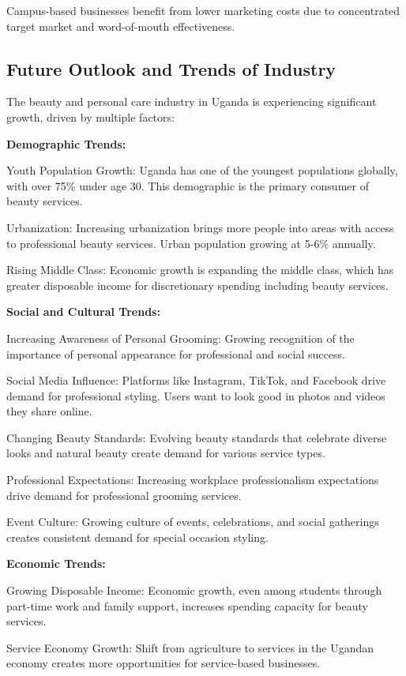 \documentclass[a4paper,12pt]{article}
\begin{document}
Campus-based businesses benefit from lower marketing costs due to concentrated target market and word-of-mouth effectiveness.

\subsection{Future Outlook and Trends of Industry}

The beauty and personal care industry in Uganda is experiencing significant growth, driven by multiple factors:

\textbf{Demographic Trends:}

Youth Population Growth: Uganda has one of the youngest populations globally, with over 75\% under age 30. This demographic is the primary consumer of beauty services.

Urbanization: Increasing urbanization brings more people into areas with access to professional beauty services. Urban population growing at 5-6\% annually.

Rising Middle Class: Economic growth is expanding the middle class, which has greater disposable income for discretionary spending including beauty services.

\textbf{Social and Cultural Trends:}

Increasing Awareness of Personal Grooming: Growing recognition of the importance of personal appearance for professional and social success.

Social Media Influence: Platforms like Instagram, TikTok, and Facebook drive demand for professional styling. Users want to look good in photos and videos they share online.

Changing Beauty Standards: Evolving beauty standards that celebrate diverse looks and natural beauty create demand for various service types.

Professional Expectations: Increasing workplace professionalism expectations drive demand for professional grooming services.

Event Culture: Growing culture of events, celebrations, and social gatherings creates consistent demand for special occasion styling.

\textbf{Economic Trends:}

Growing Disposable Income: Economic growth, even among students through part-time work and family support, increases spending capacity for beauty services.

Service Economy Growth: Shift from agriculture to services in the Ugandan economy creates more opportunities for service-based businesses.
\end{document}

